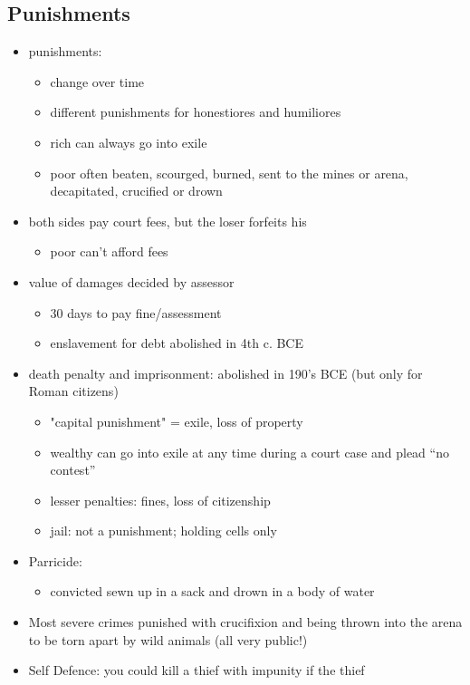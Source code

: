 \documentclass[12pt, twoside]{article}
\begin{document}
\subsection{Punishments}
\begin{itemize}
\item punishments:
	\begin{itemize} 
	\item change over time
	\item different punishments for honestiores and humiliores
	\item rich can always go into exile
	\item poor often beaten, scourged, burned, sent to the mines or arena, decapitated, crucified or drown
	\end{itemize}
\item both sides pay court fees, but the loser forfeits his
	\begin{itemize} 
	\item poor can’t afford fees
	\end{itemize}
\item value of damages decided by assessor 
	\begin{itemize}
	\item 30 days to pay fine/assessment
	\item enslavement for debt abolished in 4th c. BCE
	\end{itemize}
\item death penalty and imprisonment: abolished in 190's BCE (but only for Roman citizens)
	\begin{itemize}
	\item "capital punishment" = exile, loss of property
	\item wealthy can go into exile at any time during a court case and plead “no contest”
	\item lesser penalties: fines, loss of citizenship
	\item jail: not a punishment; holding cells only
	\end{itemize}
\item Parricide:
	\begin{itemize}
	\item convicted sewn up in a sack and drown in a body of water
	\end{itemize}
\item Most severe crimes punished with crucifixion and being thrown into the arena to be torn apart by wild animals (all very public!)
\item Self Defence: you could kill a thief with impunity if the thief

\end{itemize}
\end{document}

